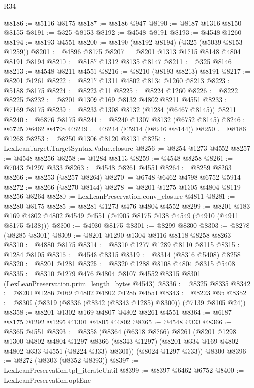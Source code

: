 \begin{lexlean}{R34}
\begin{coremodule}
@8186 := @5116 @8175
@8187 := @8186 @947
@8190 := @8187 @1316 @8150 @8155
@8191 := @325 @8153
@8192 := @4548 @8191
@8193 := @4548 @1260
@8194 := @8193 @4551
@8200 := @8190 (@8192 @8194) (@325 (@5039 @8153 @1259))
@8201 := @4896 @8175
@8207 := @8201 @1313 @1315 @8148 @4804 @8191 @8194
@8210 := @8187 @1312 @8135 @8147
@8211 := @325 @8146
@8213 := @4548 @8211 @4551
@8216 := @8210 (@8193 @8213) @8191
@8217 := @8201 @1261
@8222 := @8217 @1311 @4802 @8134 @1260 @8213
@8223 := @5188 @8175
@8224 := @8223 @11
@8225 := @8224 @1260
@8226 := @8222 @8225
@8232 := @8201 @1309 @169 @8132 @4802 @8211 @4551
@8233 := @7169 @8175
@8239 := @8233 @1308 @8132 (@1284 (@6467 @8145)) @8211
@8240 := @6876 @8175
@8244 := @8240 @1307 @8132 (@6752 @8145)
@8246 := @6725 @6462 @4798
@8249 := @8244 (@5914 (@8246 @8144))
@8250 := @8186 @1268
@8253 := @8250 @1306 @8120 @8131
@8254 := LexLeanTarget.TargetSyntax.Value.closure
@8256 := @8254 @1273 @4552
@8257 := @4548 @8256
@8258 := @1284 @8113
@8259 := @4548 @8258
@8261 := @7043 @1297 @333
@8263 := @4548 @8261 @4551
@8264 := @8259 @8263
@8266 := @8253 (@8257 @8264)
@8270 := @6748 @6462 @4798 @6752 @5914
@8272 := @8266 (@8270 @8144)
@8278 := @8201 @1275 @1305 @4804 @8119 @8256 @8264
@8280 := LexLeanPreservation.conv_closure @4811
@8281 := @8280 @8175
@8285 := @8281 @1273 @476 @4804 @4552
@8299 := @8201 @183 @169 @4802 @4802 @4549 @4551 (@4905 @8175 @138 @4549 (@4910 (@4911 @8175 @138)))
@8300 := @4930 @8175
@8301 := @8299 @8300
@8303 := @8278 (@8285 @8301)
@8309 := @8201 @1290 @1304 @8116 @8118 @8258 @8263
@8310 := @4880 @8175
@8314 := @8310 @1277 @1289 @8110 @8115
@8315 := @1284 @8105
@8316 := @4548 @8315
@8319 := @8314 (@8316 @5408) @8258
@8320 := @8201 @1281
@8325 := @8320 @1288 @8108 @4804 @8315 @5408
@8335 := @8310
    @1279
    @476
    @4804
    @8107
    @4552
    @8315
    @8301
    (LexLeanPreservation.prim_length_bytes @4543)
@8336 := @8325 @8335
@8342 := @8201 @1286 @169 @4802 @4802 @1285 @4551
@8343 := @8223 @95
@8352 := @8309 (@8319 (@8336 (@8342 (@8343 @1285) @8300)) (@7139 @8105 @24))
@8358 := @8201 @1302 @169 @4807 @4802 @8261 @4551
@8364 := @6187 @8175 @1292 @1295 @1301 @4805 @4802
@8365 := @4548 @333
@8366 := @8365 @4551
@8393 := @8358
    (@8364
      (@6318 @8366)
      @8261
      (@8201
        @1298
        @1300
        @4802
        @4804
        @1297
        @8366
        (@8343 @1297)
        (@8201 @334 @169 @4802 @4802 @333 @4551 (@8224 @333) @8300))
      (@8024 @1297 @333))
    @8300
@8396 := @8272 (@8303 (@8352 @8393))
@8397 := LexLeanPreservation.tpl_iterateUntil
@8399 := @8397 @6462 @6752
@8400 := LexLeanPreservation.optEnc

\end{coremodule}
\end{lexlean}
